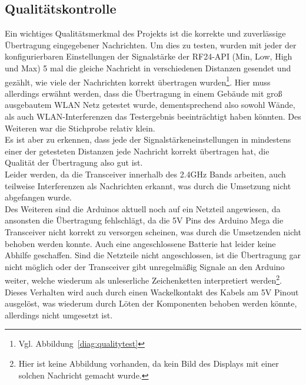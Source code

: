 \documentclass[a4paper, 11pt]{scrartcl}
\begin{document}
\subsection{Qualitätskontrolle}
Ein wichtiges Qualitätsmerkmal des Projekts ist die korrekte und zuverlässige Übertragung eingegebener Nachrichten. Um dies zu testen, wurden mit jeder der konfigurierbaren
Einstellungen der Signalstärke der RF24-API (Min, Low, High und Max) 5 mal die gleiche Nachricht in verschiedenen Distanzen gesendet und gezählt, wie viele der Nachrichten
korrekt übertragen wurden\footnote{Vgl. Abbildung~\ref{diag:qualitytest}}. Hier muss allerdings erwähnt werden, dass die Übertragung in einem Gebäude mit groß ausgebautem
WLAN Netz getestet wurde, dementsprechend also sowohl Wände, als auch WLAN-Interferenzen das Testergebnis beeinträchtigt haben könnten. Des Weiteren war die Stichprobe relativ
klein.
\\
Es ist aber zu erkennen, dass jede der Signalstärkeneinstellungen in mindestens einer der getesteten Distanzen jede Nachricht korrekt übertragen hat, die Qualität der Übertragung
also gut ist.
\\
Leider werden, da die Transceiver innerhalb des 2.4GHz Bands arbeiten, auch teilweise Interferenzen als Nachrichten erkannt, was durch die Umsetzung nicht abgefangen wurde.
\\
Des Weiteren sind die Arduinos aktuell noch auf ein Netzteil angewiesen, da ansonsten die Übertragung fehlschlägt, da die 5V Pins des Arduino Mega die Transceiver
nicht korrekt zu versorgen scheinen, was durch die Umsetzenden nicht behoben werden konnte. Auch eine angeschlossene Batterie hat leider keine Abhilfe geschaffen.
Sind die Netzteile nicht angeschlossen, ist die Übertragung gar nicht möglich oder der Transceiver gibt unregelmäßig Signale an den Arduino weiter, welche wiederum als
unleserliche Zeichenketten interpretiert werden\footnote{Hier ist keine Abbildung vorhanden, da kein Bild des Displays mit einer solchen Nachricht gemacht wurde.}. Dieses
Verhalten wird auch durch einen Wackelkontakt des Kabels am 5V Pinout ausgelöst, was wiederum durch Löten der Komponenten behoben werden könnte, allerdings nicht umgesetzt ist.
\end{document}
